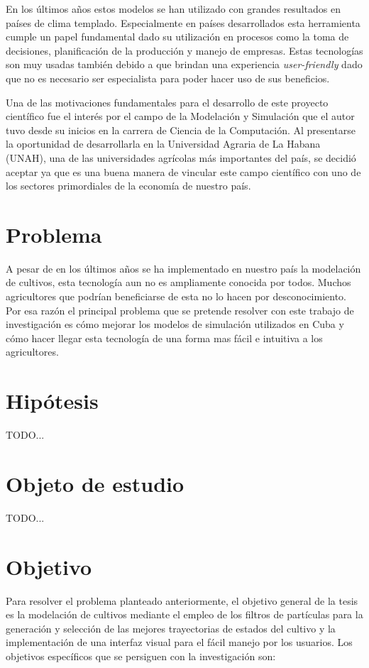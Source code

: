 En los últimos años estos modelos se han utilizado con grandes resultados en países de clima templado. Especialmente en países desarrollados esta herramienta cumple un papel fundamental dado su utilización en procesos como la toma de decisiones, planificación de la producción y manejo de empresas. Estas tecnologías son muy usadas también debido a que brindan una experiencia \textit{user-friendly} dado que no es necesario ser especialista para poder hacer uso de sus beneficios.

Una de las motivaciones fundamentales para el desarrollo de este proyecto científico fue el interés por el campo de la Modelación y Simulación que el autor tuvo desde su inicios en la carrera de Ciencia de la Computación. Al presentarse la oportunidad de desarrollarla en la Universidad Agraria de La Habana (UNAH), una de las universidades agrícolas más importantes del país, se decidió aceptar ya que es una buena manera de vincular este campo científico con uno de los sectores primordiales de la economía de nuestro país.


\section*{Problema}
A pesar de en los últimos años se ha implementado en nuestro país la modelación de cultivos, esta tecnología aun no es ampliamente conocida por todos. Muchos agricultores que podrían beneficiarse de esta no lo hacen por desconocimiento. Por esa razón el principal problema que se pretende resolver con este trabajo de investigación es cómo mejorar los modelos de simulación utilizados en Cuba y cómo hacer llegar esta tecnología de una forma mas fácil e intuitiva a los agricultores.

\section*{Hipótesis}
TODO...

\section*{Objeto de estudio}
TODO...

\section*{Objetivo}
Para resolver el problema planteado anteriormente, el objetivo general de la tesis es la modelación de cultivos mediante el empleo de los filtros de partículas para la generación y selección de las mejores trayectorias de estados del cultivo y la implementación de una interfaz visual para el fácil manejo por los usuarios.
Los objetivos específicos que se persiguen con la investigación son:

